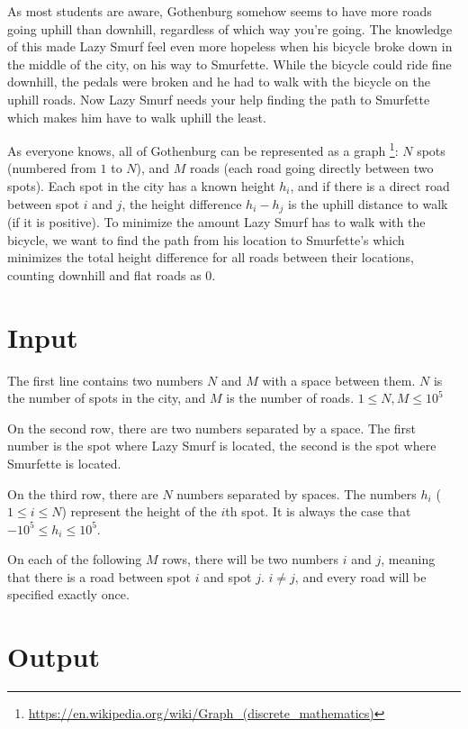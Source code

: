 
As most students are aware, Gothenburg somehow seems to have more roads going uphill than downhill,
regardless of which way you're going. The knowledge of this made Lazy Smurf feel even more hopeless
when his bicycle broke down in the middle of the city, on his way to Smurfette. While the bicycle could ride
fine downhill, the pedals were broken and he had to walk with the bicycle on the uphill roads. Now Lazy Smurf needs
your help finding the path to Smurfette which makes him have to walk
uphill the least.

As everyone knows, all of Gothenburg can be represented as a graph
\footnote{\url{https://en.wikipedia.org/wiki/Graph_(discrete_mathematics)}}:
$N$ spots (numbered from $1$ to $N$), and $M$ roads
(each road going directly between two spots). Each spot in the city has a known
height $h_i$, and if there is a direct road between spot $i$ and $j$, the height difference $h_i-h_j$
is the uphill distance to walk (if it is positive). To minimize the amount Lazy Smurf has to walk
with the bicycle, we want to find the path from his location to Smurfette's which minimizes the total
height difference for all roads between their locations, counting downhill and flat roads as 0.

\section*{Input}
The first line contains two numbers $N$ and $M$ with a space between them. $N$
is the number of spots in the city, and $M$ is the number of roads. $1 \le N, M \le 10^5$

On the second row, there are two numbers separated by a space. The first number is the spot where
Lazy Smurf is located, the second is the spot where Smurfette is located.

On the third row, there are $N$ numbers separated by spaces. The numbers $h_i$ ($1 \le i \le N$)
represent the height of the $i$th spot. It is always the case that $ -10^5 \le h_i \le 10^5 $.

On each of the following $M$ rows, there will be two numbers $i$ and $j$, meaning that there is a
road between spot $i$ and spot $j$. $i \ne j$, and every road will be specified exactly once.

\section*{Output}

